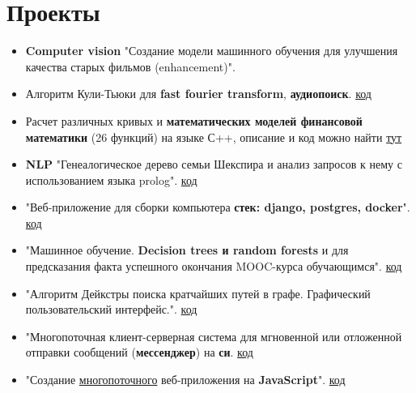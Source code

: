 \documentclass[a4paper,10pt]{report}
\begin{document}
\section{Проекты}
\begin{itemize}
    \item \textbf{Computer vision} "Создание модели машинного обучения для улучшения качества старых фильмов (enhancement)".

    \item Алгоритм Кули-Тьюки для \textbf{fast fourier transform}, \textbf{аудиопоиск}. \href{https://github.com/Suraba03/DA_MAI/tree/main/CP}{код}
    
    \item Расчет различных кривых и \textbf{математических моделей финансовой математики} (26 функций) на языке С++, описание и код можно найти \href{https://github.com/Suraba03/quantaton-2022-preparation}{тут}

    \item \textbf{NLP} "Генеалогическое дерево семьи Шекспира и анализ запросов к нему с использованием языка prolog". \href{https://github.com/Suraba03/LP/tree/main/cp}{код}

    \item "Веб-приложение для сборки компьютера \textbf{стек: django, postgres, docker}". \href{https://github.com/Leha-Slava-Max-Kirill/computer_workshop}{код}
    
    \item "Машинное обучение. \textbf{Decision trees и random forests} и  для предсказания факта успешного окончания MOOC-курса обучающимся". \href{https://github.com/Suraba03/mini_ML_project_sem1}{код}
    
    \item "Алгоритм Дейкстры поиска кратчайших путей в графе. Графический пользовательский интерфейс.". \href{https://github.com/Suraba03/mai_prooga_sem2/tree/main/cp_dm_Dijkstra}{код}
    
    \item "Многопоточная клиент-серверная система для мгновенной или отложенной отправки сообщений (\textbf{мессенджер}) на \textbf{си}. \href{https://github.com/Suraba03/OS_MAI/tree/main/cp}{код}

    \item "Создание \underline{многопоточного} веб-приложения на \textbf{JavaScript}". \href{https://github.com/Leha-Slava-Max-Kirill/application}{код}

\end{itemize}
\end{document}
